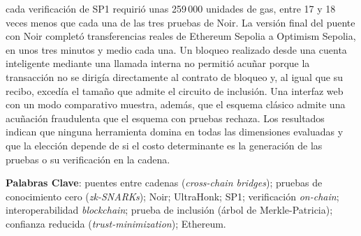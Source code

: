 cada verificación de SP1 requirió unas 259\,000 unidades de gas, entre 17 y 18 veces menos que cada
una de las tres pruebas de Noir. La versión final del puente con Noir completó transferencias
reales de Ethereum Sepolia a Optimism Sepolia, en unos tres minutos y medio cada una. Un
bloqueo realizado desde una cuenta inteligente mediante una llamada interna no permitió acuñar
porque la transacción no se dirigía directamente al contrato de bloqueo y, al igual que su
recibo, excedía el tamaño que admite el circuito de inclusión. Una interfaz web con un modo comparativo muestra, además, que el esquema
clásico admite una acuñación fraudulenta que el esquema con pruebas rechaza. Los resultados indican que ninguna herramienta domina en todas las
dimensiones evaluadas y que la elección depende de si el costo determinante es la generación de
las pruebas o su verificación en la cadena.

\vspace{0.3cm}

\noindent
\textbf{Palabras Clave}: puentes entre cadenas (\textit{cross-chain bridges}); pruebas de
conocimiento cero (\textit{zk-SNARKs}); Noir; UltraHonk; SP1; verificación \textit{on-chain};
interoperabilidad \textit{blockchain}; prueba de inclusión (árbol de Merkle-Patricia);
confianza reducida (\textit{trust-minimization}); Ethereum.